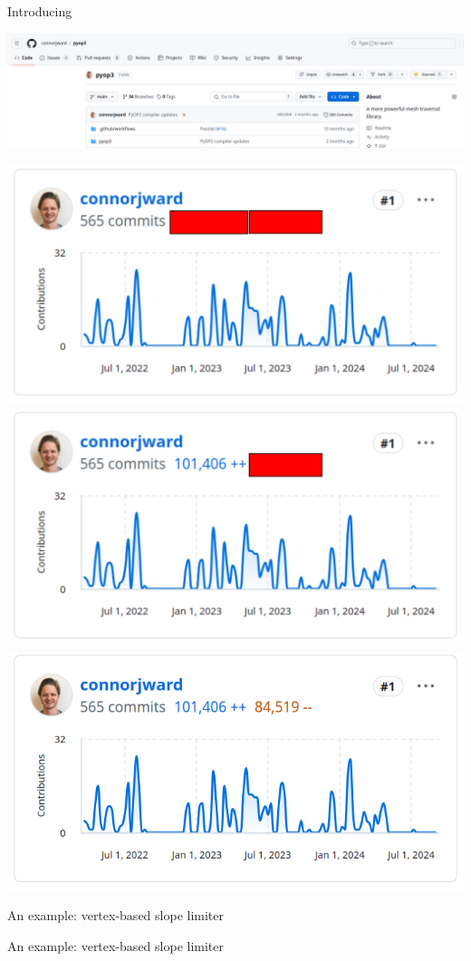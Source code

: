\documentclass[aspectratio=169]{beamer}
\begin{document}
\begin{frame}{Introducing }
  \vspace{-2em}
  \begin{center}
    \includegraphics[width=\textwidth]{pyop3_github.png}
  \end{center}

  \begin{overprint}
    \centering\includegraphics[width=.5\textwidth]{pyop3_github_stats_hidden.png}
    \centering\includegraphics[width=.5\textwidth]{pyop3_github_stats_partial.png}
    \centering\includegraphics[width=.5\textwidth]{pyop3_github_stats_full.png}
  \end{overprint}
\end{frame}

\begin{frame}{An example: vertex-based slope limiter}
\end{frame}

\begin{frame}{An example: vertex-based slope limiter}
\end{frame}
\end{document}
